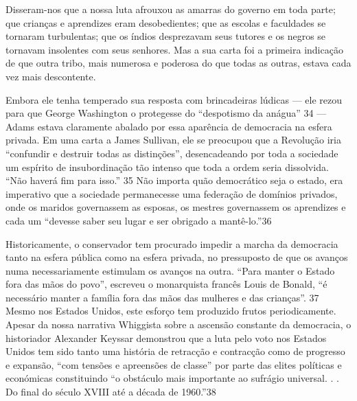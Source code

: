  \par 
Disseram-nos que a nossa luta afrouxou as amarras do governo em toda parte; que crianças e aprendizes eram desobedientes; que as escolas e faculdades se tornaram turbulentas; que os índios desprezavam seus tutores e os negros se tornavam insolentes com seus senhores. Mas a sua carta foi a primeira indicação de que outra tribo, mais numerosa e poderosa do que todas as outras, estava cada vez mais descontente.
 \par 
Embora ele tenha temperado sua resposta com brincadeiras lúdicas — ele rezou para que George Washington o protegesse do “despotismo da anágua” {\color{blue}34} — Adams estava claramente abalado por essa aparência de democracia na esfera privada. Em uma carta a James Sullivan, ele se preocupou que a Revolução iria “confundir e destruir todas as distinções”, desencadeando por toda a sociedade um espírito de insubordinação tão intenso que toda a ordem seria dissolvida. “Não haverá fim para isso.” {\color{blue}35} Não importa quão democrático seja o estado, era imperativo que a sociedade permanecesse uma federação de domínios privados, onde os maridos governassem as esposas, os mestres governassem os aprendizes e cada um “devesse saber seu lugar e ser obrigado a mantê-lo.”{\color{blue}36}
 \par 
Historicamente, o conservador tem procurado impedir a marcha da democracia tanto na esfera pública como na esfera privada, no pressuposto de que os avanços numa necessariamente estimulam os avanços na outra. “Para manter o Estado fora das mãos do povo”, escreveu o monarquista francês Louis de Bonald, “é necessário manter a família fora das mãos das mulheres e das crianças”. {\color{blue}37} Mesmo nos Estados Unidos, este esforço tem produzido frutos periodicamente. Apesar da nossa narrativa Whiggista sobre a ascensão constante da democracia, o historiador Alexander Keyssar demonstrou que a luta pelo voto nos Estados Unidos tem sido tanto uma história de retracção e contracção como de progresso e expansão, “com tensões e apreensões de classe” por parte das elites políticas e económicas constituindo “o obstáculo mais importante ao sufrágio universal. . . Do final do século XVIII até a década de 1960.”{\color{blue}38}
 \par 
